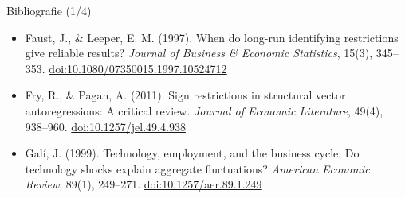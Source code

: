 \begin{frame}{Bibliografie (1/4)}
\begin{itemize}
    \item Faust, J., \& Leeper, E. M. (1997). When do long-run identifying restrictions give reliable results? \textit{Journal of Business \& Economic Statistics}, 15(3), 345--353. \href{https://doi.org/10.1080/07350015.1997.10524712}{doi:10.1080/07350015.1997.10524712}
    \item Fry, R., \& Pagan, A. (2011). Sign restrictions in structural vector autoregressions: A critical review. \textit{Journal of Economic Literature}, 49(4), 938--960. \href{https://doi.org/10.1257/jel.49.4.938}{doi:10.1257/jel.49.4.938}
    \item Galí, J. (1999). Technology, employment, and the business cycle: Do technology shocks explain aggregate fluctuations? \textit{American Economic Review}, 89(1), 249--271. \href{https://doi.org/10.1257/aer.89.1.249}{doi:10.1257/aer.89.1.249}
\end{itemize}
\end{frame}

